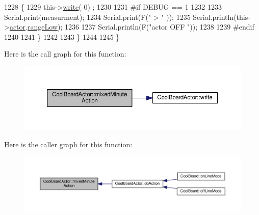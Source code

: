 \begin{DoxyCode}
1228             \{
1229                 this->\hyperlink{class_cool_board_actor_a958786ff01ea1056ee72c72d439f86da}{write}( 0) ;
1230             
1231 \textcolor{preprocessor}{            #if DEBUG == 1 }
1232 
1233                 Serial.print(measurment);
1234                 Serial.print(F(\textcolor{stringliteral}{" > "} ));
1235                 Serial.println(this->\hyperlink{class_cool_board_actor_a8f190db9f7a39fddbcef7f152da970e9}{actor}.\hyperlink{struct_cool_board_actor_1_1state_a43f891c9fb3bb63575c27cec860de55a}{rangeLow});
1236 
1237                 Serial.println(F(\textcolor{stringliteral}{"actor OFF "}));
1238 
1239 \textcolor{preprocessor}{            #endif  }
1240                 
1241             \}
1242 
1243     \}
1244 
1245 \}
\end{DoxyCode}
Here is the call graph for this function\+:
\nopagebreak
\begin{figure}[H]
\begin{center}
\leavevmode
\includegraphics[width=350pt]{dc/d69/class_cool_board_actor_a2b8a79a27288d5246e3e3860ae76770d_cgraph}
\end{center}
\end{figure}
Here is the caller graph for this function\+:
\nopagebreak
\begin{figure}[H]
\begin{center}
\leavevmode
\includegraphics[width=350pt]{dc/d69/class_cool_board_actor_a2b8a79a27288d5246e3e3860ae76770d_icgraph}
\end{center}
\end{figure}
\mbox{\label{class_cool_board_actor_a00b29c4abf0388551aa6812372113cf1}} 
